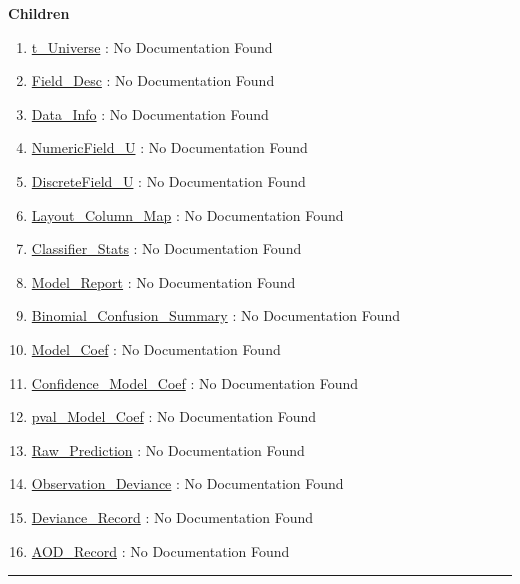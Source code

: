 \textbf{Children}
\begin{enumerate}
\item \hyperlink{ecldoc:logisticregression.types.t_universe}{t\_Universe}
: No Documentation Found
\item \hyperlink{ecldoc:logisticregression.types.field_desc}{Field\_Desc}
: No Documentation Found
\item \hyperlink{ecldoc:logisticregression.types.data_info}{Data\_Info}
: No Documentation Found
\item \hyperlink{ecldoc:logisticregression.types.numericfield_u}{NumericField\_U}
: No Documentation Found
\item \hyperlink{ecldoc:logisticregression.types.discretefield_u}{DiscreteField\_U}
: No Documentation Found
\item \hyperlink{ecldoc:logisticregression.types.layout_column_map}{Layout\_Column\_Map}
: No Documentation Found
\item \hyperlink{ecldoc:logisticregression.types.classifier_stats}{Classifier\_Stats}
: No Documentation Found
\item \hyperlink{ecldoc:logisticregression.types.model_report}{Model\_Report}
: No Documentation Found
\item \hyperlink{ecldoc:logisticregression.types.binomial_confusion_summary}{Binomial\_Confusion\_Summary}
: No Documentation Found
\item \hyperlink{ecldoc:logisticregression.types.model_coef}{Model\_Coef}
: No Documentation Found
\item \hyperlink{ecldoc:logisticregression.types.confidence_model_coef}{Confidence\_Model\_Coef}
: No Documentation Found
\item \hyperlink{ecldoc:logisticregression.types.pval_model_coef}{pval\_Model\_Coef}
: No Documentation Found
\item \hyperlink{ecldoc:logisticregression.types.raw_prediction}{Raw\_Prediction}
: No Documentation Found
\item \hyperlink{ecldoc:logisticregression.types.observation_deviance}{Observation\_Deviance}
: No Documentation Found
\item \hyperlink{ecldoc:logisticregression.types.deviance_record}{Deviance\_Record}
: No Documentation Found
\item \hyperlink{ecldoc:logisticregression.types.aod_record}{AOD\_Record}
: No Documentation Found
\end{enumerate}

\rule{\linewidth}{0.5pt}

